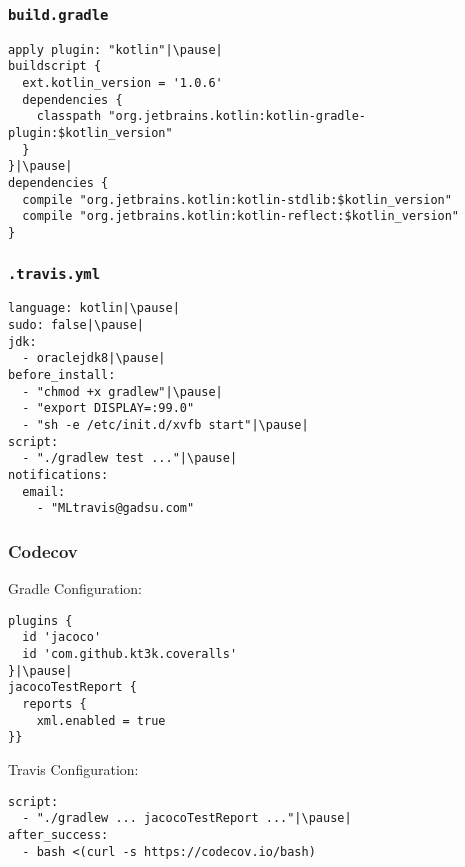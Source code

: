 


\begin{frame}[fragile] \frametitle{\texttt{build.gradle}}
\begin{lstlisting}
apply plugin: "kotlin"|\pause|
buildscript {
  ext.kotlin_version = '1.0.6'
  dependencies {
    classpath "org.jetbrains.kotlin:kotlin-gradle-plugin:$kotlin_version"
  }
}|\pause|
dependencies {
  compile "org.jetbrains.kotlin:kotlin-stdlib:$kotlin_version"
  compile "org.jetbrains.kotlin:kotlin-reflect:$kotlin_version"
}
\end{lstlisting}
\end{frame}


\begin{frame}[fragile] \frametitle{\texttt{.travis.yml}}
\begin{lstlisting}
language: kotlin|\pause|
sudo: false|\pause|
jdk:
  - oraclejdk8|\pause|
before_install:
  - "chmod +x gradlew"|\pause|
  - "export DISPLAY=:99.0"
  - "sh -e /etc/init.d/xvfb start"|\pause|
script:
  - "./gradlew test ..."|\pause|
notifications:
  email:
    - "MLtravis@gadsu.com"
\end{lstlisting}
\end{frame}


\begin{frame}[fragile] \frametitle{Codecov} 
Gradle Configuration:

\begin{lstlisting}
plugins {
  id 'jacoco'
  id 'com.github.kt3k.coveralls'
}|\pause|
jacocoTestReport {
  reports {
    xml.enabled = true
}}
\end{lstlisting}
\pause

Travis Configuration:

\begin{lstlisting}
script:
  - "./gradlew ... jacocoTestReport ..."|\pause|
after_success:
  - bash <(curl -s https://codecov.io/bash)
\end{lstlisting}


\end{frame}


